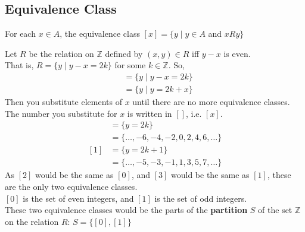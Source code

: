 \documentclass[../notes.tex]{subfiles}
\begin{document}
			\subsection{Equivalence Class}
				For each $x \in A$, the equivalence class $[x] = \{y \mid y \in A$ and $ x R y\}$
				\begin{example}
					Let $R$ be the relation on $\mathbb{Z}$ defined by $(x, y) \in R$ iff $y - x$ is even.\\
					That is, $R = \{y \mid y - x = 2k\}$ for some $k \in \mathbb{Z}$.
					So,
					\begin{align*}
						[x] &= \{y \mid y - x = 2k\}\\
						&= \{y \mid y = 2k + x\}
					\end{align*}
					Then you substitute elements of $x$ until there are no more equivalence classes.\\
					The number you substitute for $x$ is written in $[]$, i.e. $[x]$.
					\begin{align*}
						[0] &= \{y = 2k\}\\
						&= \{\ldots, -6, -4, -2, 0, 2, 4, 6, \ldots\}\\
						[1] &= \{y = 2k + 1\}\\
						&= \{\ldots, -5, -3, -1, 1, 3, 5, 7, \ldots\}
					\end{align*}
					As $[2]$ would be the same as $[0]$, and $[3]$ would be the same as $[1]$, these are the only two equivalence classes.\\
					$[0]$ is the set of even integers, and $[1]$ is the set of odd integers.\\
					These two equivalence classes would be the parts of the \textbf{partition} $S$ of the set $\mathbb{Z}$ on the relation $R$: $S = \bigl\{[0], [1]\bigr\}$
				\end{example}
\end{document}
